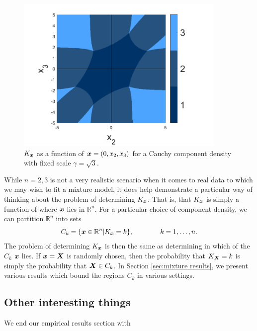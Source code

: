 	\begin{figure}
		\centering
		\includegraphics[width=0.9\textwidth]{cauchy_flag_graph.png}
		\caption{$K_{\bm{{x}}}$ as a function of ${\bm{{x}}} = (0, x_2, x_3)$ for a Cauchy component density with fixed scale $\gamma = \sqrt{3}$.}
		\label{fig:cauchy_flag_graph}
	\end{figure}
	
	While $n = 2,3$ is not a very realistic scenario when it comes to real data to which we may wish to fit a mixture model, it does help demonstrate a particular way of thinking about the problem of determining $K_{\bm{{x}}}$. That is, that $K_{\bm{{x}}}$ is simply a function of where ${\bm{{x}}}$ lies in $\mathbb{R}^n$. For a particular choice of component density, we can partition $\mathbb{R}^n$ into sets 
	\begin{equation}
		C_k = \{ {\bm{{x}}} \in \mathbb{R}^n | K_{{\bm{{x}}}} = k \}, \hspace{40pt} k = 1,\dots,n.
		\label{eq: C_k partition sets}
	\end{equation}
	The problem of determining $K_{{\bm{{x}}}}$ is then the same as determining in which of the $C_k$ ${\bm{{x}}}$ lies. If ${\bm{{x}}} = {\bm{{X}}}$ is randomly chosen, then the probability that $K_{\bm{{X}}} = k$ is simply the probability that ${\bm{{X}}} \in C_k$. In Section \ref{sec:mixture results}, we present various results which bound the regions $C_k$ in various settings.

	\subsection{Other interesting things}
	We end our empirical results section with 

